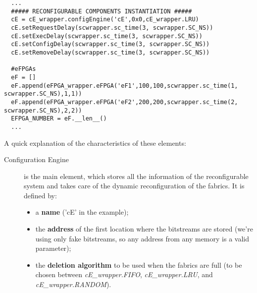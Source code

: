 \scriptsize
\begin{verbatim}
  ...
  ##### RECONFIGURABLE COMPONENTS INSTANTIATION #####
  cE = cE_wrapper.configEngine('cE',0x0,cE_wrapper.LRU)
  cE.setRequestDelay(scwrapper.sc_time(3, scwrapper.SC_NS))
  cE.setExecDelay(scwrapper.sc_time(3, scwrapper.SC_NS))
  cE.setConfigDelay(scwrapper.sc_time(3, scwrapper.SC_NS))
  cE.setRemoveDelay(scwrapper.sc_time(3, scwrapper.SC_NS))

  #eFPGAs
  eF = []
  eF.append(eFPGA_wrapper.eFPGA('eF1',100,100,scwrapper.sc_time(1, scwrapper.SC_NS),1,1))
  eF.append(eFPGA_wrapper.eFPGA('eF2',200,200,scwrapper.sc_time(2, scwrapper.SC_NS),2,2))
  EFPGA_NUMBER = eF.__len__()
  ...
\end{verbatim}
\normalsize
A quick explanation of the characteristics of these elements:
\begin{description}
  \item[Configuration Engine] is the main element, which stores all the information of the reconfigurable system and takes care of the dynamic reconfiguration of the fabrics. It is defined by:
  \begin{itemize}
    \item a \textbf{name} ('cE' in the example);
    \item the \textbf{address} of the first location where the bitstreams are stored (we're using only fake bitstreams, so any address from any memory is a valid parameter);
    \item the \textbf{deletion algorithm} to be used when the fabrics are full (to be chosen between \textit{cE\_wrapper.FIFO}, \textit{cE\_wrapper.LRU}, and \textit{cE\_wrapper.RANDOM}).
  \end{itemize}


\end{description}
